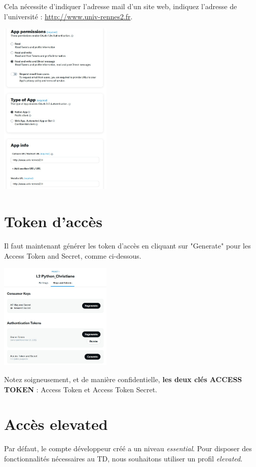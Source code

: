 \documentclass[11pt,a4paper]{article}
\begin{document}
Cela nécessite d'indiquer l'adresse mail d'un site web, indiquez l'adresse de l'université :  \url{http://www.univ-rennes2.fr}.

\begin{center}
    \includegraphics[width=0.4\textwidth]{etapes_cle/step5.jpg}
\end{center}


\section{Token d'accès}

Il faut maintenant générer les token d'accès en cliquant sur "Generate" pour les Access Token and Secret, comme ci-dessous. 
\begin{center}
    \includegraphics[width=0.4\textwidth]{etapes_cle/step4.jpg}
\end{center}
Notez soigneusement, et de manière confidentielle, \textbf{les deux clés ACCESS TOKEN } : Access Token et Access Token Secret.







\section{Accès elevated}
Par défaut, le compte développeur créé a un niveau \emph{essential}. Pour disposer des fonctionnalités nécessaires au TD, nous souhaitons utiliser un profil \emph{elevated}.
\end{document}
